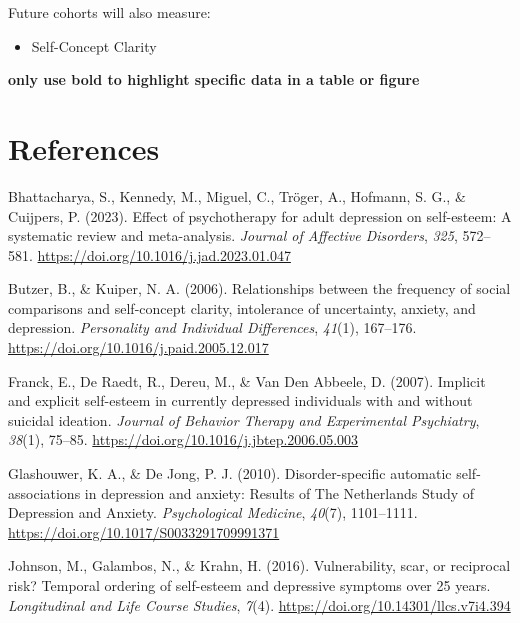 \documentclass[
  man,
  longtable,
  nolmodern,
  notxfonts,
  notimes,
  colorlinks=true,linkcolor=blue,citecolor=blue,urlcolor=blue]{apa7}
\providecommand{\tightlist}{%
  \setlength{\itemsep}{0pt}\setlength{\parskip}{0pt}}
\newlength{\cslhangindent}
\newenvironment{CSLReferences}[2] %
 {\begin{list}{}{%
  \setlength{\itemindent}{0pt}
  \setlength{\leftmargin}{0pt}
  \setlength{\parsep}{0pt}
  \ifodd #1
   \setlength{\leftmargin}{\cslhangindent}
   \setlength{\itemindent}{-1\cslhangindent}
  \fi
  \setlength{\itemsep}{#2\baselineskip}}}
 {\end{list}}
\begin{document}
Future cohorts will also measure:

\begin{itemize}
\tightlist
\item
  Self-Concept Clarity
\end{itemize}

\textbf{only use bold to highlight specific data in a table or figure}

\section{References}\label{references}

\label{refs}
\begin{CSLReferences}{1}{0}
Bhattacharya, S., Kennedy, M., Miguel, C., Tröger, A., Hofmann, S. G.,
\& Cuijpers, P. (2023). Effect of psychotherapy for adult depression on
self-esteem: {A} systematic review and meta-analysis. \emph{Journal of
Affective Disorders}, \emph{325}, 572--581.
\url{https://doi.org/10.1016/j.jad.2023.01.047}

Butzer, B., \& Kuiper, N. A. (2006). Relationships between the frequency
of social comparisons and self-concept clarity, intolerance of
uncertainty, anxiety, and depression. \emph{Personality and Individual
Differences}, \emph{41}(1), 167--176.
\url{https://doi.org/10.1016/j.paid.2005.12.017}

Franck, E., De Raedt, R., Dereu, M., \& Van Den Abbeele, D. (2007).
Implicit and explicit self-esteem in currently depressed individuals
with and without suicidal ideation. \emph{Journal of Behavior Therapy
and Experimental Psychiatry}, \emph{38}(1), 75--85.
\url{https://doi.org/10.1016/j.jbtep.2006.05.003}

Glashouwer, K. A., \& De Jong, P. J. (2010). Disorder-specific automatic
self-associations in depression and anxiety: Results of {The}
{Netherlands} {Study} of {Depression} and {Anxiety}. \emph{Psychological
Medicine}, \emph{40}(7), 1101--1111.
\url{https://doi.org/10.1017/S0033291709991371}

Johnson, M., Galambos, N., \& Krahn, H. (2016). Vulnerability, scar, or
reciprocal risk? {Temporal} ordering of self-esteem and depressive
symptoms over 25 years. \emph{Longitudinal and Life Course Studies},
\emph{7}(4). \url{https://doi.org/10.14301/llcs.v7i4.394}


\end{CSLReferences}
\end{document}
